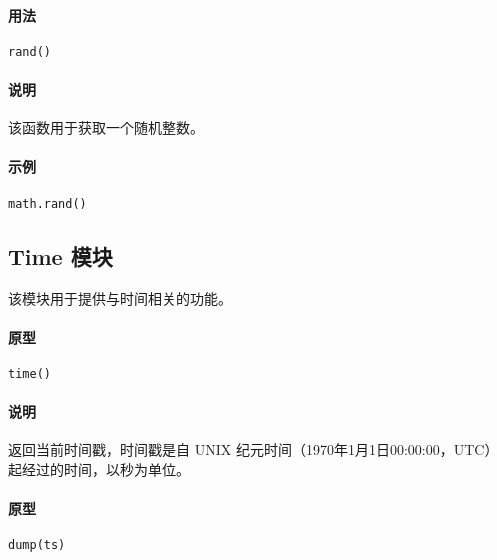 \paragraph{用法}
\begin{lstlisting}[language=berry, numbers=none]
rand()
\end{lstlisting}

\paragraph{说明}
该函数用于获取一个随机整数。

\paragraph{示例}
\begin{lstlisting}[language=berry, numbers=none]
math.rand()
\end{lstlisting}

\subsection{Time 模块}

该模块用于提供与时间相关的功能。


\paragraph{原型}
\begin{lstlisting}[language=berry, numbers=none]
time()
\end{lstlisting}

\paragraph{说明}
返回当前时间戳，时间戳是自 UNIX 纪元时间（1970年1月1日00:00:00，UTC）起经过的时间，以秒为单位。


\paragraph{原型}
\begin{lstlisting}[language=berry, numbers=none]
dump(ts)
\end{lstlisting}

